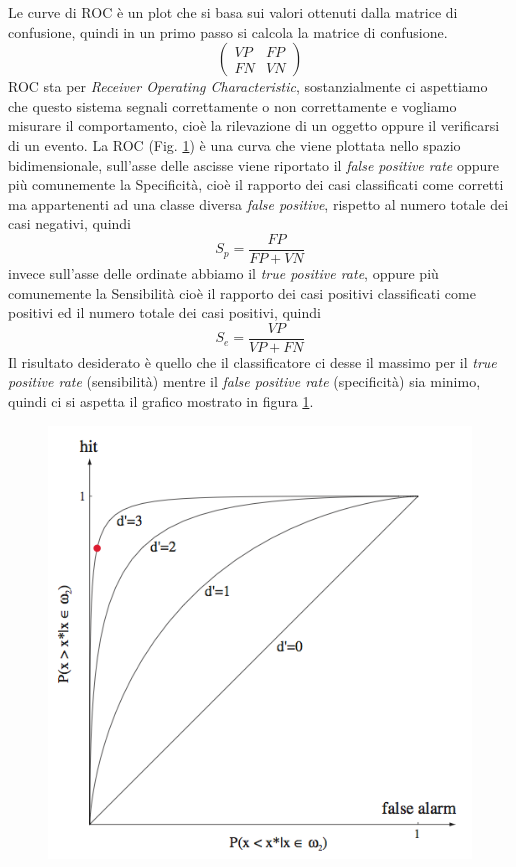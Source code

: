Le curve di ROC è un plot che si basa sui valori ottenuti dalla matrice di confusione, quindi in un primo passo si calcola la matrice di confusione.
\[
\left(
\begin{array}{cc}
 VP & FP \\
 FN & VN 
\end{array}
\right)
\]
ROC sta per \emph{Receiver Operating Characteristic}, sostanzialmente ci aspettiamo che questo sistema segnali correttamente o non correttamente e vogliamo misurare il comportamento, cioè la rilevazione di un oggetto oppure il verificarsi di un evento. La ROC (Fig. \ref{roc}) è una curva che viene plottata nello spazio bidimensionale, sull'asse delle ascisse viene riportato il \emph{false positive rate} oppure più comunemente la Specificità, cioè il rapporto dei casi classificati come corretti ma appartenenti ad una classe diversa \emph{false positive}, rispetto al numero totale dei casi negativi, quindi
\begin{equation}
S_p = \frac{FP}{FP+VN}
\end{equation}
invece sull'asse delle ordinate abbiamo il \emph{true positive rate}, oppure più comunemente la Sensibilità cioè il rapporto dei casi positivi classificati come positivi ed il numero totale dei casi positivi, quindi
\begin{equation}
S_e = \frac{VP}{VP+FN}
\end{equation}
Il risultato desiderato è quello che il classificatore ci desse il  massimo per il \emph{true positive rate} (sensibilità) mentre il \emph{false positive rate} (specificità) sia minimo, quindi ci si aspetta il grafico mostrato in figura \ref{roc}.
\begin{figure}
\centering
\includegraphics[scale=0.5]{img/roc.png}
\caption{}
\label{roc}
\end{figure}
